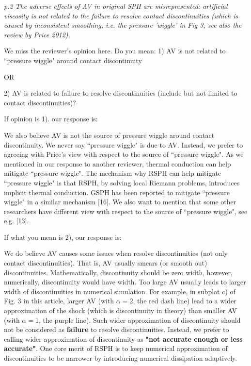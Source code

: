 \documentclass[10pt,a4paper]{article}
\begin{document}
\textit{p.2 The adverse effects of AV in original SPH are misrepresented: artificial viscosity is not related to the failure to resolve contact discontinuities (which is caused by inconsistent smoothing, i.e. the pressure 'wiggle' in Fig 3, see also the review by Price 2012).}

We miss the reviewer's opinion here.
Do you mean: 
1) AV is not related to ``pressure wiggle" around contact discontinuity

OR
 
2) AV is related to failure to resolve discontinuities (include but not limited to contact discontinuities)? 

If opinion is 1). our response is: 

We also believe AV is not the source of pressure wiggle around contact discontinuity.
We never say ``pressure wiggle" is due to AV. Instead, we prefer to agreeing with Price's view with respect to the source of ``pressure wiggle". As we mentioned in our response to another reviewer, thermal conduction can help mitigate ``pressure wiggle". The mechanism why RSPH can help mitigate ``pressure wiggle" is that RSPH, by solving local Riemann problems, introduces implicit thermal conduction. GSPH has been reported to mitigate ``pressure wiggle" in a similar mechanism [16]. We also want to mention that some other researchers have different view with respect to the source of ``pressure wiggle", see e.g. [13].

If what you mean is 2), our response is:

We do believe AV causes some issues when resolve discontinuities (not only contact discontinuities). That is, AV usually smears (or smooth out) discontinuities. Mathematically, discontinuity should be zero width, however, numerically, discontinuity would have width. Too large AV usually leads to larger width of discontinuities in numerical simulation. For example, in subplot c) of Fig. 3 in this article, larger AV (with $\alpha = 2$, the red dash line) lead to a wider approximation of the shock (which is discontinuity in theory) than smaller AV (with $\alpha = 1$, the purple line). 
Such wider approximation of discontinuity should not be considered as \textbf{failure} to resolve discontinuities. Instead, we prefer to calling wider approximation of discontinuity as \textbf{"not accurate enough or less accurate"}. One core merit of RSPH is to keep numerical approximation of discontinuities to be narrower by introducing numerical dissipation adaptively.
\\[3pt]
 
\end{document}
